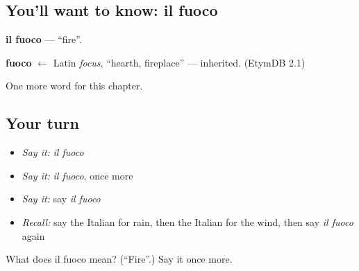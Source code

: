 \subsection*{You'll want to know: il fuoco}
\textbf{il fuoco} — \textquotedblleft{}fire\textquotedblright{}.

\begin{cousinweb}
\textbf{fuoco} $\leftarrow$ Latin \emph{focus}, \textquotedblleft{}hearth, fireplace\textquotedblright{} — inherited. (EtymDB 2.1)
\end{cousinweb}

\begin{grammarlens}[title={What you've built}]
One more word for this chapter.
\end{grammarlens}

\subsection*{Your turn}
\begin{itemize}
\raggedright
  \item \emph{Say it:} \emph{il fuoco}
  \item \emph{Say it:} \emph{il fuoco}, once more
  \item \emph{Say it:} say \emph{il fuoco}
  \item \emph{Recall:} say the Italian for rain, then the Italian for the wind, then say \emph{il fuoco} again
\end{itemize}

\begin{tcolorbox}[breakable,colback=teal!4,colframe=teal!35!black,title={Before you move on}]
What does il fuoco mean? (\textquotedblleft{}Fire\textquotedblright{}.) Say it once more.
\end{tcolorbox}
